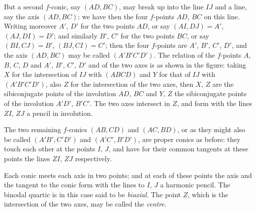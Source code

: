 \documentclass[11pt,a4paper]{book}
\begin{document}
But a second $f$-conic, say $(AD, BC)$, may break up into the line $IJ$ and a line, say the axis $(AD, BC)$: we have then the four $f$-points $AD$, $BC$ on this line. Writing moreover $A'$, $D'$ for the two points $AD$, or say $(AI, DJ) = A'$, $(AJ, DI) = D'$; and similarly $B'$, $C'$ for the two points $BC$, or say $(BI, CJ) = B'$, $(BJ, CI) = C'$; then the four $f$-points are $A'$, $B'$, $C'$, $D'$, and the axis $(AD, BC)$ may be called $(A'B'C'D')$. The relation of the $f$-points $A$, $B$, $C$, $D$ and $A'$, $B'$, $C'$, $D'$ and of the two axes is as shown in the figure: taking $X$ for the intersection of $IJ$ with $(ABCD)$ and $Y$ for that of $IJ$ with $(A'B'C'D')$, also $Z$ for the intersection of the two axes, then $X$, $Z$ are the sibiconjugate points of the involution $AD$, $BC$ and $Y$, $Z$ the sibiconjugate points of the involution $A'D'$, $B'C'$. The two axes intersect in $Z$, and form with the lines $ZI$, $ZJ$ a pencil in involution.

The two remaining $f$-conics $(AB, CD)$ and $(AC, BD)$, or as they might also be called $(A'B', C'D')$ and $(A'C', B'D')$, are proper conics as before: they touch each other at the points $I$, $J$, and have for their common tangents at these points the lines $ZI$, $ZJ$ respectively.


Each conic meets each axis in two points; and at each of these points the axis and the tangent to the conic form with the lines to $I$, $J$ a harmonic pencil. The binodal quartic is in this case said to be \emph{biaxial}. The point $Z$, which is the intersection of the two axes, may be called the \emph{centre}.
\end{document}
